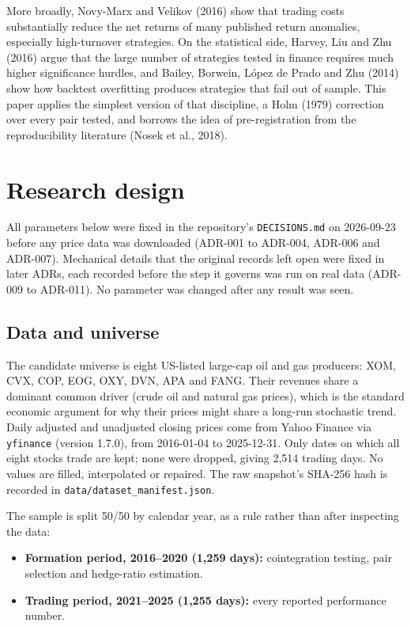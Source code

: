 \documentclass[11pt]{article}
\providecommand{\tightlist}{\setlength{\itemsep}{0pt}\setlength{\parskip}{0pt}}
\begin{document}
More broadly, Novy-Marx and Velikov (2016) show that trading costs
substantially reduce the net returns of many published return anomalies,
especially high-turnover strategies. On the statistical side, Harvey, Liu
and Zhu (2016) argue that the large number of strategies tested in finance
requires much higher significance hurdles, and Bailey, Borwein, López de
Prado and Zhu (2014) show how backtest overfitting produces strategies
that fail out of sample. This paper applies the simplest version of that
discipline, a Holm (1979) correction over every pair tested, and borrows
the idea of pre-registration from the reproducibility literature (Nosek et
al., 2018).

\hypertarget{research-design}{%
\section{Research design}\label{research-design}}

All parameters below were fixed in the repository's \texttt{DECISIONS.md} on
2026-09-23 before any price data was downloaded (ADR-001 to ADR-004,
ADR-006 and ADR-007). Mechanical details that the original records left
open were fixed in later ADRs, each recorded before the step it governs
was run on real data (ADR-009 to ADR-011). No parameter was changed after
any result was seen.

\hypertarget{data-and-universe}{%
\subsection{Data and universe}\label{data-and-universe}}

The candidate universe is eight US-listed large-cap oil and gas producers:
XOM, CVX, COP, EOG, OXY, DVN, APA and FANG. Their revenues share a dominant
common driver (crude oil and natural gas prices), which is the standard
economic argument for why their prices might share a long-run stochastic
trend. Daily adjusted and unadjusted closing prices come from Yahoo Finance
via \texttt{yfinance} (version 1.7.0), from 2016-01-04 to 2025-12-31. Only dates
on which all eight stocks trade are kept; none were dropped, giving 2,514
trading days. No values are filled, interpolated or repaired. The raw
snapshot's SHA-256 hash is recorded in \texttt{data/dataset\_manifest.json}.

The sample is split 50/50 by calendar year, as a rule rather than after
inspecting the data:

\begin{itemize}
\tightlist
\item
  \textbf{Formation period, 2016--2020 (1,259 days):} cointegration testing, pair
  selection and hedge-ratio estimation.
\item
  \textbf{Trading period, 2021--2025 (1,255 days):} every reported performance
  number.
\end{itemize}
\end{document}
